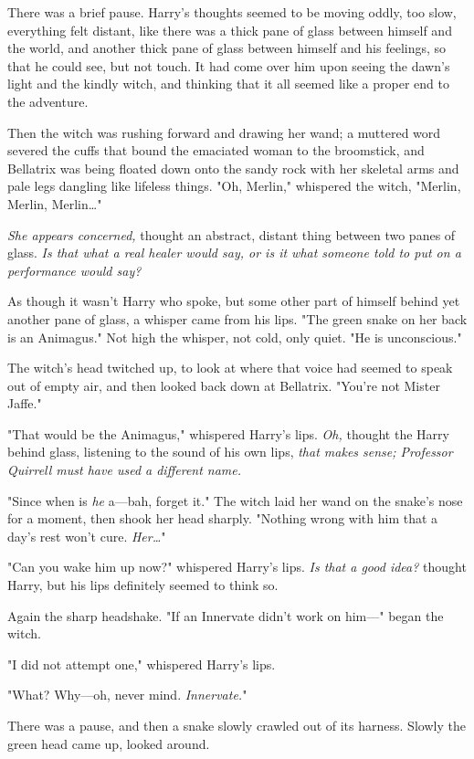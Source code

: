 There was a brief pause. Harry's thoughts seemed to be moving oddly, too slow, 
everything felt distant, like there was a thick pane of glass between himself 
and the world, and another thick pane of glass between himself and his 
feelings, so that he could see, but not touch. It had come over him upon seeing 
the dawn's light and the kindly witch, and thinking that it all seemed like a 
proper end to the adventure.

Then the witch was rushing forward and drawing her wand; a muttered word 
severed the cuffs that bound the emaciated woman to the broomstick, and 
Bellatrix was being floated down onto the sandy rock with her skeletal arms and 
pale legs dangling like lifeless things. "Oh, Merlin," whispered the witch, 
"Merlin, Merlin, Merlin{\ldots}"

\emph{She appears concerned,} thought an abstract, distant thing between two 
panes of glass. \emph{Is that what a real healer would say, or is it what 
someone told to put on a performance would say?}

As though it wasn't Harry who spoke, but some other part of himself behind yet 
another pane of glass, a whisper came from his lips. "The green snake on her 
back is an Animagus." Not high the whisper, not cold, only quiet. "He is 
unconscious."

The witch's head twitched up, to look at where that voice had seemed to speak 
out of empty air, and then looked back down at Bellatrix. "You're not Mister 
Jaffe."

"That would be the Animagus," whispered Harry's lips. \emph{Oh,} thought the 
Harry behind glass, listening to the sound of his own lips, \emph{that makes 
sense; Professor Quirrell must have used a different name.}

"Since when is \emph{he} a---bah, forget it." The witch laid her wand on the 
snake's nose for a moment, then shook her head sharply. "Nothing wrong with him 
that a day's rest won't cure. \emph{Her{\ldots}}"

"Can you wake him up now?" whispered Harry's lips. \emph{Is that a good idea?} 
thought Harry, but his lips definitely seemed to think so.

Again the sharp headshake. "If an Innervate didn't work on him---" began the 
witch.

"I did not attempt one," whispered Harry's lips.

"What? Why---oh, never mind. \emph{Innervate.}"

There was a pause, and then a snake slowly crawled out of its harness. Slowly 
the green head came up, looked around.

